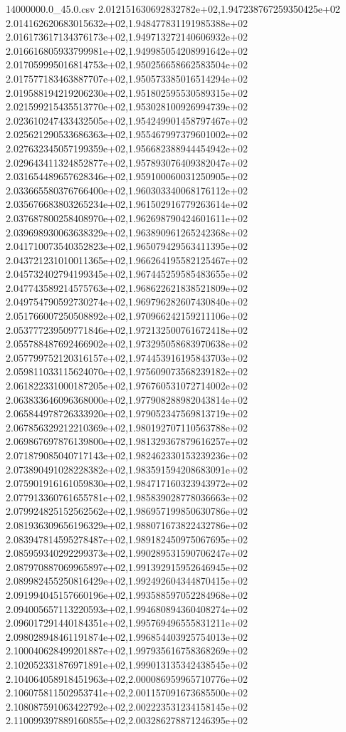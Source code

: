 \begin{filecontents*}{14000000.0_45.0.csv}
2.012151630692832782e+02,1.947238767259350425e+02
2.014162620683015632e+02,1.948477831191985388e+02
2.016173617134376173e+02,1.949713272140606932e+02
2.016616805933799981e+02,1.949985054208991642e+02
2.017059995016814753e+02,1.950256658662583504e+02
2.017577183463887707e+02,1.950573385016514294e+02
2.019588194219206230e+02,1.951802595530589315e+02
2.021599215435513770e+02,1.953028100926994739e+02
2.023610247433432505e+02,1.954249901458797467e+02
2.025621290533686363e+02,1.955467997379601002e+02
2.027632345057199359e+02,1.956682388944454942e+02
2.029643411324852877e+02,1.957893076409382047e+02
2.031654489657628346e+02,1.959100060031250905e+02
2.033665580376766400e+02,1.960303340068176112e+02
2.035676683803265234e+02,1.961502916779263614e+02
2.037687800258408970e+02,1.962698790424601611e+02
2.039698930063638329e+02,1.963890961265242368e+02
2.041710073540352823e+02,1.965079429563411395e+02
2.043721231010011365e+02,1.966264195582125467e+02
2.045732402794199345e+02,1.967445259585483655e+02
2.047743589214575763e+02,1.968622621838521809e+02
2.049754790592730274e+02,1.969796282607430840e+02
2.051766007250508892e+02,1.970966242159211106e+02
2.053777239509771846e+02,1.972132500761672418e+02
2.055788487692466902e+02,1.973295058683970638e+02
2.057799752120316157e+02,1.974453916195843703e+02
2.059811033115624070e+02,1.975609073568239182e+02
2.061822331000187205e+02,1.976760531072714002e+02
2.063833646096368000e+02,1.977908288982043814e+02
2.065844978726333920e+02,1.979052347569813719e+02
2.067856329212210369e+02,1.980192707110563788e+02
2.069867697876139800e+02,1.981329367879616257e+02
2.071879085040717143e+02,1.982462330153239236e+02
2.073890491028228382e+02,1.983591594208683091e+02
2.075901916161059830e+02,1.984717160323943972e+02
2.077913360761655781e+02,1.985839028778036663e+02
2.079924825152562562e+02,1.986957199850630786e+02
2.081936309656196329e+02,1.988071673822432786e+02
2.083947814595278487e+02,1.989182450975067695e+02
2.085959340292299373e+02,1.990289531590706247e+02
2.087970887069965897e+02,1.991392915952646945e+02
2.089982455250816429e+02,1.992492604344870415e+02
2.091994045157660196e+02,1.993588597052284968e+02
2.094005657113220593e+02,1.994680894360408274e+02
2.096017291440184351e+02,1.995769496555831211e+02
2.098028948461191874e+02,1.996854403925754013e+02
2.100040628499201887e+02,1.997935616758368269e+02
2.102052331876971891e+02,1.999013135342438545e+02
2.104064058918451963e+02,2.000086959965710776e+02
2.106075811502953741e+02,2.001157091673685500e+02
2.108087591063422792e+02,2.002223531234158145e+02
2.110099397889160855e+02,2.003286278871246395e+02

\end{filecontents*}
